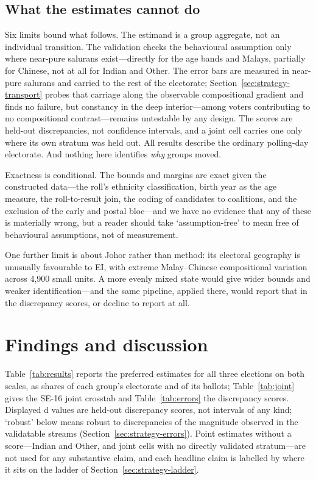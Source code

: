 \documentclass[11pt]{article}
\begin{document}
\subsection{What the estimates cannot do}
\label{sec:strategy-limits}

Six limits bound what follows. The estimand is a group aggregate, not an individual transition. The validation checks the behavioural assumption only where near-pure salurans exist---directly for the age bands and Malays, partially for Chinese, not at all for Indian and Other. The error bars are measured in near-pure salurans and carried to the rest of the electorate; Section~\ref{sec:strategy-transport} probes that carriage along the observable compositional gradient and finds no failure, but constancy in the deep interior---among voters contributing to no compositional contrast---remains untestable by any design. The scores are held-out discrepancies, not confidence intervals, and a joint cell carries one only where its own stratum was held out. All results describe the ordinary polling-day electorate. And nothing here identifies \emph{why} groups moved.

Exactness is conditional. The bounds and margins are exact given the constructed data---the roll's ethnicity classification, birth year as the age measure, the roll-to-result join, the coding of candidates to coalitions, and the exclusion of the early and postal bloc---and we have no evidence that any of these is materially wrong, but a reader should take `assumption-free' to mean free of behavioural assumptions, not of measurement.

One further limit is about Johor rather than method: its electoral geography is unusually favourable to EI, with extreme Malay--Chinese compositional variation across 4,900 small units. A more evenly mixed state would give wider bounds and weaker identification---and the same pipeline, applied there, would report that in the discrepancy scores, or decline to report at all.

\section{Findings and discussion}
\label{sec:findings}

Table~\ref{tab:results} reports the preferred estimates for all three elections on both scales, as shares of each group's electorate and of its ballots; Table~\ref{tab:joint} gives the SE-16 joint crosstab and Table~\ref{tab:errors} the discrepancy scores. Displayed \textsf{d} values are held-out discrepancy scores, not intervals of any kind; `robust' below means robust to discrepancies of the magnitude observed in the validatable streams (Section~\ref{sec:strategy-errors}). Point estimates without a score---Indian and Other, and joint cells with no directly validated stratum---are not used for any substantive claim, and each headline claim is labelled by where it sits on the ladder of Section~\ref{sec:strategy-ladder}.
\end{document}
